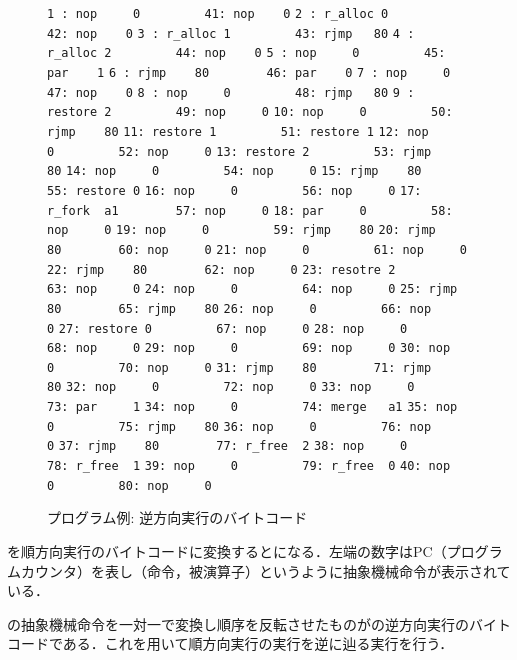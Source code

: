 \documentclass[submit,PRO]{ipsj}
\def\|{\verb|}
\begin{document}
\begin{figure}[tb]
\vbox{
\hbox{\|1 : nop     0         41: nop    0|}
\hbox{\|2 : r_alloc 0         42: nop    0|}
\hbox{\|3 : r_alloc 1         43: rjmp   80|}
\hbox{\|4 : r_alloc 2         44: nop    0|}
\hbox{\|5 : nop     0         45: par    1|}
\hbox{\|6 : rjmp    80        46: par    0|}
\hbox{\|7 : nop     0         47: nop    0|}
\hbox{\|8 : nop     0         48: rjmp   80|}
\hbox{\|9 : restore 2         49: nop     0|}
\hbox{\|10: nop     0         50: rjmp    80|}
\hbox{\|11: restore 1         51: restore 1|}
\hbox{\|12: nop     0         52: nop     0|}
\hbox{\|13: restore 2         53: rjmp    80|}
\hbox{\|14: nop     0         54: nop     0|}
\hbox{\|15: rjmp    80        55: restore 0|}
\hbox{\|16: nop     0         56: nop     0|}
\hbox{\|17: r_fork  a1        57: nop     0|}
\hbox{\|18: par     0         58: nop     0|}
\hbox{\|19: nop     0         59: rjmp    80|}
\hbox{\|20: rjmp    80        60: nop     0|}
\hbox{\|21: nop     0         61: nop     0|}
\hbox{\|22: rjmp    80        62: nop     0|}
\hbox{\|23: resotre 2         63: nop     0|}
\hbox{\|24: nop     0         64: nop     0|}
\hbox{\|25: rjmp    80        65: rjmp    80|}
\hbox{\|26: nop     0         66: nop     0|}
\hbox{\|27: restore 0         67: nop     0|}
\hbox{\|28: nop     0         68: nop     0|}
\hbox{\|29: nop     0         69: nop     0|}
\hbox{\|30: nop     0         70: nop     0|}
\hbox{\|31: rjmp    80        71: rjmp    80|}
\hbox{\|32: nop     0         72: nop     0|}
\hbox{\|33: nop     0         73: par     1|}
\hbox{\|34: nop     0         74: merge   a1|} 
\hbox{\|35: nop     0         75: rjmp    80|}
\hbox{\|36: nop     0         76: nop     0|}
\hbox{\|37: rjmp    80        77: r_free  2|}
\hbox{\|38: nop     0         78: r_free  1|}
\hbox{\|39: nop     0         79: r_free  0|}
\hbox{\|40: nop     0         80: nop     0|}
}
\centerline{}
\caption{プログラム例: 逆方向実行のバイトコード}
\label{fig:backward}
\end{figure}




を順方向実行のバイトコードに変換するとになる．左端の数字はPC（プログラムカウンタ）を表し（命令，被演算子）というように抽象機械命令が表示されている．

の抽象機械命令を一対一で変換し順序を反転させたものがの逆方向実行のバイトコードである．これを用いて順方向実行の実行を逆に辿る実行を行う．
\end{document}
